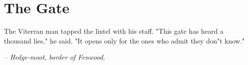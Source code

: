 \chapter*{The Gate}

The Viterran man tapped the lintel with his staff. "This gate has heard a thousand lies," he said. "It opens only for the ones who admit they don"t know."

\smallskip

\noindent \textit{-- Hedge‑moot, border of Fenwood.}

